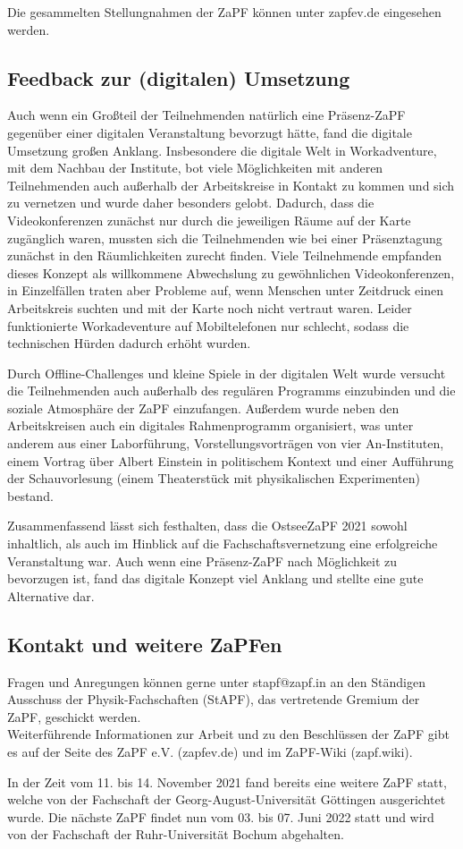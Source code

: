 \documentclass{scrartcl}
\begin{document}
Die gesammelten Stellungnahmen der ZaPF können unter zapfev.de eingesehen werden.

\subsection*{Feedback zur (digitalen) Umsetzung}

Auch wenn ein Großteil der Teilnehmenden natürlich eine Präsenz-ZaPF gegenüber einer digitalen Veranstaltung bevorzugt hätte, fand die digitale Umsetzung großen Anklang. Insbesondere die digitale Welt in Workadventure, mit dem Nachbau der Institute, bot viele Möglichkeiten mit anderen Teilnehmenden auch außerhalb der Arbeitskreise in Kontakt zu kommen und sich zu vernetzen und wurde daher besonders gelobt. Dadurch, dass die Videokonferenzen zunächst nur durch die jeweiligen Räume auf der Karte zugänglich waren, mussten sich die Teilnehmenden wie bei einer Präsenztagung zunächst in den Räumlichkeiten zurecht finden. Viele Teilnehmende empfanden dieses Konzept als willkommene Abwechslung zu gewöhnlichen Videokonferenzen, in Einzelfällen traten aber Probleme auf, wenn Menschen unter Zeitdruck einen Arbeitskreis suchten und mit der Karte noch nicht vertraut waren. Leider funktionierte Workadeventure auf Mobiltelefonen nur schlecht, sodass die technischen Hürden dadurch erhöht wurden.

Durch Offline-Challenges und kleine Spiele in der digitalen Welt wurde versucht die Teilnehmenden auch außerhalb des regulären Programms einzubinden und die soziale Atmosphäre der ZaPF einzufangen. Außerdem wurde neben den Arbeitskreisen auch ein digitales Rahmenprogramm organisiert, was unter anderem aus einer Laborführung, Vorstellungsvorträgen von vier An-Instituten, einem Vortrag über Albert Einstein in politischem Kontext und einer Aufführung der Schauvorlesung (einem Theaterstück mit physikalischen Experimenten) bestand.

Zusammenfassend lässt sich festhalten, dass die OstseeZaPF 2021 sowohl inhaltlich, als auch im Hinblick auf die Fachschaftsvernetzung eine erfolgreiche Veranstaltung war. Auch wenn eine Präsenz-ZaPF nach Möglichkeit zu bevorzugen ist, fand das digitale Konzept viel Anklang und stellte eine gute Alternative dar.

\subsection*{Kontakt und weitere ZaPFen}

Fragen und Anregungen können gerne unter stapf@zapf.in an den Ständigen Ausschuss der Physik-Fachschaften (StAPF), das vertretende Gremium der ZaPF, geschickt werden.\\
Weiterführende Informationen zur Arbeit und zu den Beschlüssen der ZaPF gibt es auf der Seite des ZaPF e.V. (zapfev.de) und im ZaPF-Wiki (zapf.wiki).

In der Zeit vom 11. bis 14. November 2021 fand bereits eine weitere ZaPF statt, welche von der Fachschaft der Georg-August-Universität Göttingen ausgerichtet wurde. Die nächste ZaPF findet nun vom 03. bis 07. Juni 2022 statt und wird von der Fachschaft der Ruhr-Universität Bochum abgehalten.
\end{document}
